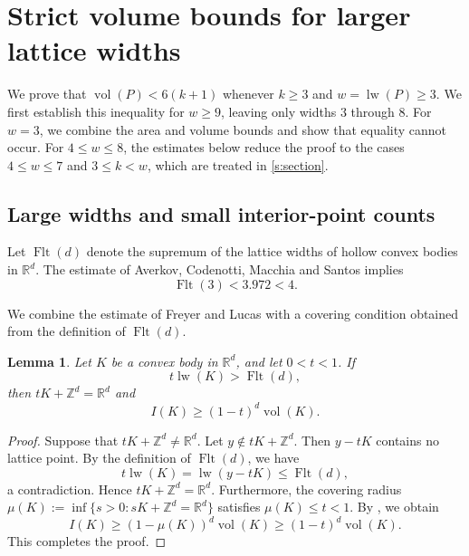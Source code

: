 \documentclass[reqno, 11pt]{article}
\numberwithin{equation}{section}
\newtheorem{lemma}[lemma]{Lemma}
\theoremstyle{definition}
\newcommand{\R}{\mathbb R}
\newcommand{\Z}{\mathbb Z}
\DeclareMathOperator{\vol}{vol}
\numberwithin{equation}{section}
\begin{document}
\section{Strict volume bounds for larger lattice widths}\label{sec:general}

We prove that \(\operatorname{vol}(P)<6(k+1)\) whenever \(k\ge3\) and \(w=\operatorname{lw}(P)\ge3\). We first establish this inequality for \(w\ge9\), leaving only widths $3$ through $8$. For \(w=3\), we combine the area and volume bounds and show that equality cannot occur. For \(4\le w\le8\), the estimates below reduce the proof to the cases \(4\le w\le7\) and \(3\le k<w\), which are treated in \cref{s:section}.


\subsection{Large widths and small interior-point counts}

Let $\operatorname{Flt}(d)$ denote the supremum of the lattice widths of hollow convex bodies in $\R^d$. 
The estimate of Averkov, Codenotti, Macchia and Santos \cite[Theorem~5.2]{ACMS2021} implies
\begin{equation}\label{l:flatness}
 \operatorname{Flt}(3)<3.972<4.
\end{equation}

We combine the estimate of Freyer and Lucas \cite[Proposition~1.6]{FL2022} with a covering condition obtained from the definition of \(\operatorname{Flt}(d)\).

\begin{lemma}\label{l:count}
  Let \(K\) be a convex body in \(\mathbb R^d\), and let \(0<t<1\). If
\[
t\operatorname{lw}(K)>\operatorname{Flt}(d),
\]
then \(tK+\mathbb Z^d=\mathbb R^d\) and
\[
I(K)\ge(1-t)^d\operatorname{vol}(K).
\]
\end{lemma} 

\begin{proof} 
Suppose that \(tK+\mathbb Z^d\ne\mathbb R^d\). Let \(y\notin tK+\mathbb Z^d\). Then \(y-tK\) contains no lattice point. By the definition of \(\operatorname{Flt}(d)\), we have 
\[
t\operatorname{lw}(K)=\operatorname{lw}(y-tK)\le\operatorname{Flt}(d),
\]
a contradiction. Hence \(tK+\mathbb Z^d=\mathbb R^d\). Furthermore, the covering radius $\mu(K):=\inf\{s>0:sK+\Z^d=\R^d\}$ satisfies $\mu(K)\le t<1$. By \cite[Proposition~1.6]{FL2022}, we obtain 
$$I(K)\ge(1-\mu(K))^d\vol(K)\ge(1-t)^d\vol(K).$$
This completes the proof.
\end{proof}
\end{document}
